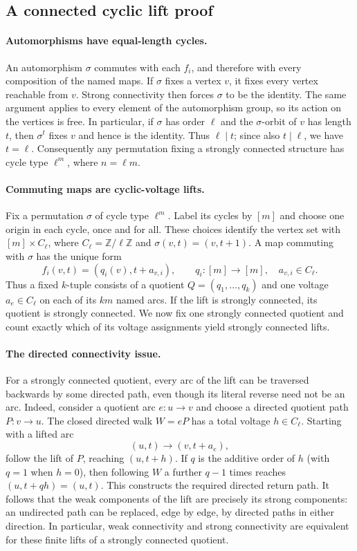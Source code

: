 \documentclass[11pt,letterpaper]{article}
\theoremstyle{remark}\newtheorem{remark}[theorem]{Remark}
\numberwithin{equation}{section}
\begin{document}
\subsection{A connected cyclic lift proof}
\paragraph{Automorphisms have equal-length cycles.}
An automorphism $\sigma$ commutes with each $f_i$, and therefore with
every composition of the named maps.  If $\sigma$ fixes a vertex $v$,
it fixes every vertex reachable from $v$.  Strong connectivity then
forces $\sigma$ to be the identity.  The same argument applies to
every element of the automorphism group, so its action on the vertices
is free.  In particular, if $\sigma$ has order $\ell$ and the
$\sigma$-orbit of $v$ has length $t$, then $\sigma^t$ fixes $v$ and
hence is the identity.  Thus $\ell\mid t$; since also $t\mid\ell$,
we have $t=\ell$.  Consequently any permutation fixing a strongly
connected structure has cycle type $\ell^m$, where $n=\ell m$.

\paragraph{Commuting maps are cyclic-voltage lifts.}
Fix a permutation $\sigma$ of cycle type $\ell^m$.  Label its cycles
by $[m]$ and choose one origin in each cycle, once and for all.  These
choices identify the vertex set with $[m]\times C_\ell$, where
$C_\ell=\mathbb Z/\ell\mathbb Z$ and
$\sigma(v,t)=(v,t+1)$.  A map commuting with $\sigma$ has the unique
form
\[
 f_i(v,t)=(q_i(v),t+a_{v,i}),
 \qquad q_i:[m]\longrightarrow[m],\quad a_{v,i}\in C_\ell.
\]
Thus a fixed $k$-tuple consists of a quotient $Q=(q_1,\ldots,q_k)$
and one voltage $a_e\in C_\ell$ on each of its $km$ named arcs.
If the lift is strongly connected, its quotient is strongly connected.
We now fix one strongly connected quotient and count exactly which
of its voltage assignments yield strongly connected lifts.

\paragraph{The directed connectivity issue.}
For a strongly connected quotient, every arc of the lift can be
traversed backwards by some directed path, even though its literal
reverse need not be an arc.  Indeed, consider a quotient arc
$e:u\to v$ and choose a directed quotient path $P:v\to u$.
The closed directed walk $W=eP$ has a total voltage $h\in C_\ell$.
Starting with a lifted arc
\[
 (u,t)\longrightarrow(v,t+a_e),
\]
follow the lift of $P$, reaching $(u,t+h)$.  If $q$ is the additive
order of $h$ (with $q=1$ when $h=0$), then following $W$ a further
$q-1$ times reaches $(u,t+qh)=(u,t)$.  This constructs the required
directed return path.  It follows that the weak components of the
lift are precisely its strong components: an undirected path can
be replaced, edge by edge, by directed paths in either direction.
In particular, weak connectivity and strong connectivity are
equivalent for these finite lifts of a strongly connected quotient.
\end{document}
